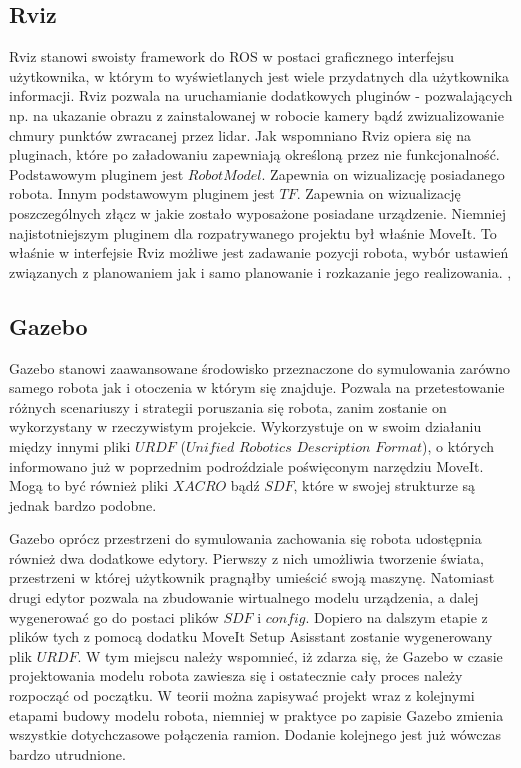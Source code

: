 \subsection{Rviz}
Rviz stanowi swoisty framework do ROS w postaci graficznego interfejsu użytkownika, w którym to wyświetlanych jest wiele przydatnych dla użytkownika informacji. Rviz pozwala na uruchamianie dodatkowych pluginów - pozwalających np. na ukazanie obrazu z zainstalowanej w robocie kamery bądź zwizualizowanie chmury punktów zwracanej przez lidar. Jak wspomniano Rviz opiera się na pluginach, które po załadowaniu zapewniają określoną przez nie funkcjonalność. Podstawowym pluginem jest $RobotModel$. Zapewnia on wizualizację posiadanego robota. Innym podstawowym pluginem jest $TF$. Zapewnia on wizualizację poszczególnych złącz w jakie zostało wyposażone posiadane urządzenie. Niemniej najistotniejszym pluginem dla rozpatrywanego projektu był właśnie MoveIt. To właśnie w interfejsie Rviz możliwe jest zadawanie pozycji robota, wybór ustawień związanych z planowaniem jak i samo planowanie i rozkazanie jego realizowania.
\cite{Rviz_rep}, \cite{Rviz}


\subsection{Gazebo}


Gazebo stanowi zaawansowane środowisko przeznaczone do symulowania zarówno samego robota jak i otoczenia w którym się znajduje. Pozwala na przetestowanie różnych scenariuszy i strategii poruszania się robota, zanim zostanie on wykorzystany w rzeczywistym projekcie. Wykorzystuje on w swoim działaniu między innymi pliki $URDF$ ($Unified$ $Robotics$ $Description$ $Format$), o których informowano już w poprzednim podroździale poświęconym narzędziu MoveIt. Mogą to być również pliki $XACRO$ bądź $SDF$, które w swojej strukturze są jednak bardzo podobne. 


Gazebo oprócz przestrzeni do symulowania zachowania się robota udostępnia również dwa dodatkowe edytory. Pierwszy z nich umożliwia tworzenie świata, przestrzeni w której użytkownik pragnąłby umieścić swoją maszynę. Natomiast drugi edytor pozwala na zbudowanie wirtualnego modelu urządzenia, a dalej wygenerować go do postaci plików $SDF$ i $config$. Dopiero na dalszym etapie z plików tych z pomocą dodatku MoveIt Setup Asisstant zostanie wygenerowany plik $URDF$. W tym miejscu należy wspomnieć, iż zdarza się, że Gazebo w czasie projektowania modelu robota zawiesza się i ostatecznie cały proces należy rozpocząć od początku. W teorii można zapisywać projekt wraz z kolejnymi etapami budowy modelu robota, niemniej w praktyce po zapisie Gazebo zmienia wszystkie dotychczasowe połączenia ramion. Dodanie kolejnego jest już wówczas bardzo utrudnione.  \cite{Gazebo}

